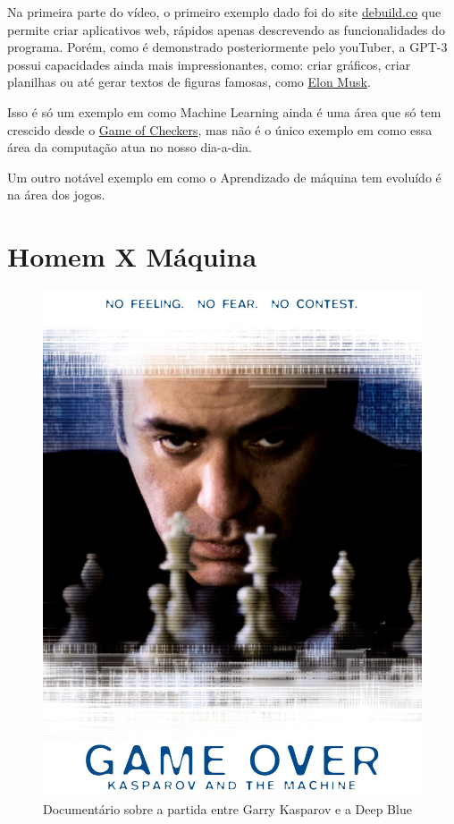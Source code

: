 \documentclass[12pt]{article}
\begin{document}
    Na primeira parte do vídeo, o primeiro exemplo dado foi do site \href{https://debuild.co/}{debuild.co} 
    que permite criar aplicativos web, rápidos apenas descrevendo as funcionalidades do programa. 
    Porém, como é demonstrado posteriormente pelo youTuber, a GPT-3 possui capacidades ainda mais 
    impressionantes, como: criar gráficos, criar planilhas ou até gerar textos de 
    figuras famosas, como \href{https://pt.wikipedia.org/wiki/Elon_Musk}{Elon Musk}.

    Isso é só um exemplo em como Machine Learning ainda é uma área que só tem 
    crescido desde o \href{../Capitulo_01/Capitulo01.pdf}{Game of Checkers}, mas não é 
    o único exemplo em como essa área da computação atua no nosso dia-a-dia.

    Um outro notável exemplo em como o Aprendizado de máquina tem evoluído é
    na área dos jogos.

    \newpage
    \section{Homem X Máquina} \label{sec:deep_blue}

    \begin{figure}[htp]
        \centering
        \includegraphics[scale=0.2]{GameOver.jpg}
        \caption{\centering Documentário sobre a partida entre Garry Kasparov e a Deep Blue}
    \end{figure}
\end{document}
